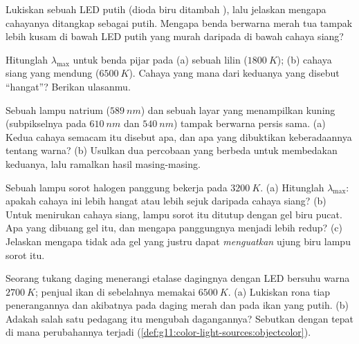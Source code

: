 \begin{exercise}[$\star\star$]\label{exo:g11:color-light-sources:10}
Lukiskan  sebuah LED putih (dioda biru ditambah ), lalu
jelaskan mengapa cahayanya ditangkap sebagai putih. Mengapa benda
berwarna merah tua tampak lebih kusam di bawah LED putih yang murah
daripada di bawah cahaya siang?
\end{exercise}

\begin{exercise}[$\star\star$]\label{exo:g11:color-light-sources:11}
Hitunglah $\lambda_{\max}$ untuk benda pijar pada (a)  sebuah
lilin ($\qty{1800}{K}$); (b)  cahaya siang yang mendung
($\qty{6500}{K}$). Cahaya yang mana dari keduanya yang disebut
``hangat''? Berikan ulasanmu.
\end{exercise}

\begin{exercise}[$\star\star\star$]\label{exo:g11:color-light-sources:12}
Sebuah lampu natrium ($\qty{589}{nm}$) dan sebuah layar yang
menampilkan kuning (subpikselnya pada $\qty{610}{nm}$ dan
$\qty{540}{nm}$) tampak berwarna persis sama. (a) Kedua cahaya semacam
itu disebut apa, dan apa yang dibuktikan keberadaannya tentang warna?
(b) Usulkan dua percobaan yang berbeda untuk membedakan keduanya, lalu
ramalkan hasil masing-masing.
\end{exercise}

\begin{exercise}[$\star\star\star$]\label{exo:g11:color-light-sources:13}
Sebuah lampu sorot halogen panggung bekerja pada $\qty{3200}{K}$.
(a) Hitunglah $\lambda_{\max}$: apakah cahaya ini lebih hangat atau
lebih sejuk daripada cahaya siang? (b) Untuk menirukan cahaya siang,
lampu sorot itu ditutup dengan gel biru pucat. Apa yang dibuang gel itu,
dan mengapa panggungnya menjadi lebih redup? (c) Jelaskan mengapa tidak
ada gel yang justru dapat \emph{menguatkan} ujung biru  lampu
sorot itu.
\end{exercise}

\begin{exercise}[$\star\star\star$]\label{exo:g11:color-light-sources:14}
Seorang tukang daging menerangi etalase dagingnya dengan LED bersuhu
warna $\qty{2700}{K}$; penjual ikan di sebelahnya memakai
$\qty{6500}{K}$. (a) Lukiskan rona tiap penerangannya dan akibatnya
pada daging merah dan pada ikan yang putih. (b) Adakah salah satu
pedagang itu mengubah dagangannya? Sebutkan dengan tepat di mana
perubahannya terjadi (\cref{def:g11:color-light-sources:objectcolor}).
\end{exercise}

